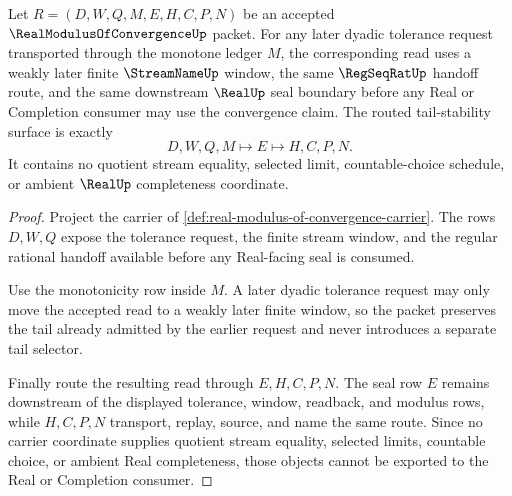 \begin{theorem}
\label{thm:real-modulus-of-convergence-tail-stability}
Let $R=(D,W,Q,M,E,H,C,P,N)$ be an accepted $\RealModulusOfConvergenceUp$ packet. For any later dyadic tolerance request transported through the monotone ledger $M$, the corresponding read uses a weakly later finite $\StreamNameUp$ window, the same $\RegSeqRatUp$ handoff route, and the same downstream $\RealUp$ seal boundary before any Real or Completion consumer may use the convergence claim. The routed tail-stability surface is exactly
$$
D,W,Q,M \longmapsto E \longmapsto H,C,P,N .
$$
It contains no quotient stream equality, selected limit, countable-choice schedule, or ambient $\RealUp$ completeness coordinate.
\end{theorem}
\begin{proof}
Project the carrier of \autoref{def:real-modulus-of-convergence-carrier}. The rows $D,W,Q$ expose the tolerance request, the finite stream window, and the regular rational handoff available before any Real-facing seal is consumed.

Use the monotonicity row inside $M$. A later dyadic tolerance request may only move the accepted read to a weakly later finite window, so the packet preserves the tail already admitted by the earlier request and never introduces a separate tail selector.

Finally route the resulting read through $E,H,C,P,N$. The seal row $E$ remains downstream of the displayed tolerance, window, readback, and modulus rows, while $H,C,P,N$ transport, replay, source, and name the same route. Since no carrier coordinate supplies quotient stream equality, selected limits, countable choice, or ambient Real completeness, those objects cannot be exported to the Real or Completion consumer.
\end{proof}

